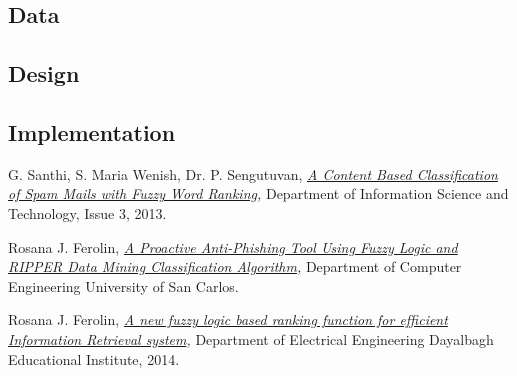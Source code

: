 \documentclass[a4paper]{article}
\begin{document}
\subsection{Data}
\lipsum[3]


\subsection{Design}
\lipsum[2]


\subsection{Implementation}
\lipsum[1]

%
%
\begin{thebibliography}{9}

    G. Santhi, S. Maria Wenish, Dr. P. Sengutuvan,
    \textit{
        \href{https://github.com/Menziess/Fuzzy-Logic-Email-Classification/raw/master/report/res/a_content_based_classification_of_spam_mails_with_fuzzy_word_ranking.pdf}{A Content Based Classification of Spam Mails with Fuzzy Word Ranking},
    }
    Department of Information Science and Technology,
    Issue 3,
    2013.

    Rosana J. Ferolin,
    \textit{
        \href{https://github.com/Menziess/Fuzzy-Logic-Email-Classification/raw/master/report/res/a_proactive_anti-phishing_tool_using_fuzzy_logic_and_ripper_data_mining_classification_algorithm.pdf}{A Proactive Anti-Phishing Tool Using Fuzzy Logic and RIPPER Data Mining Classification Algorithm},
    }
    Department of Computer Engineering University of San Carlos.

    Rosana J. Ferolin,
    \textit{
        \href{https://github.com/Menziess/Fuzzy-Logic-Email-Classification/raw/master/report/res/a_new_fuzzy_logic_based_ranking_function_for_efficient_information_retrieval_system.pdf}{A new fuzzy logic based ranking function for efficient Information Retrieval system},
    }
    Department of Electrical Engineering Dayalbagh Educational Institute,
    2014.

\end{thebibliography}
\end{document}
